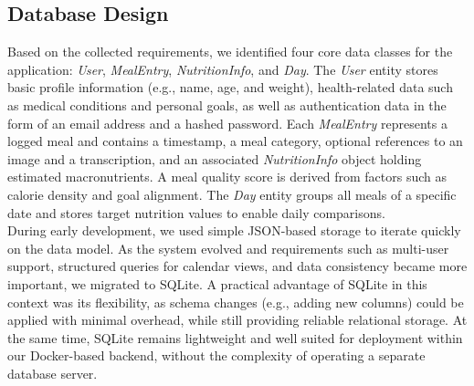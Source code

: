 \documentclass[11pt,a4paper]{article}
\begin{document}
\subsection{Database Design}
\label{chap:db}
Based on the collected requirements, we identified four core data classes for the application: \textit{User}, \textit{MealEntry}, \textit{NutritionInfo}, and \textit{Day}. The \textit{User} entity stores basic profile information (e.g., name, age, and weight), health-related data such as medical conditions and personal goals, as well as authentication data in the form of an email address and a hashed password. Each \textit{MealEntry} represents a logged meal and contains a timestamp, a meal category, optional references to an image and a transcription, and an associated \textit{NutritionInfo} object holding estimated macronutrients. A meal quality score is derived from factors such as calorie density and goal alignment. The \textit{Day} entity groups all meals of a specific date and stores target nutrition values to enable daily comparisons.
\\
During early development, we used simple JSON-based storage to iterate quickly on the data model. As the system evolved and requirements such as multi-user support, structured queries for calendar views, and data consistency became more important, we migrated to SQLite. A practical advantage of SQLite in this context was its flexibility, as schema changes (e.g., adding new columns) could be applied with minimal overhead, while still providing reliable relational storage. At the same time, SQLite remains lightweight and well suited for deployment within our Docker-based backend, without the complexity of operating a separate database server.

\FloatBarrier
\end{document}
